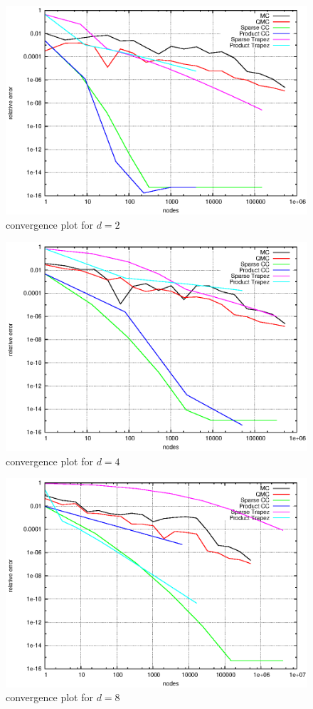 \documentclass[]{article}
\begin{document}
\begin{figure}[!ht]
\centering
\includegraphics[width=.9\textwidth]{task13_d2}
\caption{convergence plot for $d=2$}
\label{fig:Task13b}
\end{figure}

\begin{figure}[!ht]
\centering
\includegraphics[width=.9\textwidth]{task13_d4}
\caption{convergence plot for $d=4$}
\label{fig:Task13c}
\end{figure}

\begin{figure}[!ht]
\centering
\includegraphics[width=.9\textwidth]{task13_d8}
\caption{convergence plot for $d=8$}
\label{fig:Task13d}
\end{figure}
\clearpage
\end{document}
